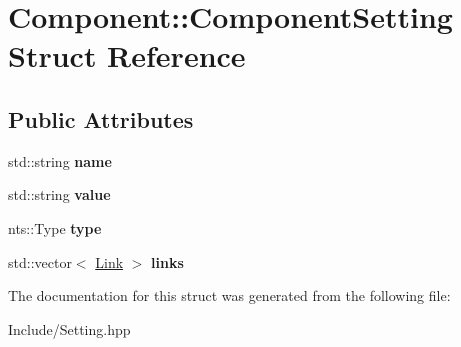 \hypertarget{structComponent_1_1ComponentSetting}{}\section{Component\+:\+:Component\+Setting Struct Reference}
\label{structComponent_1_1ComponentSetting}
\subsection*{Public Attributes}
\begin{DoxyCompactItemize}
\item 
\mbox{\label{structComponent_1_1ComponentSetting_aae5ad8d8f44adeb832d1cb1359835ead}} 
std\+::string {\bfseries name}
\item 
\mbox{\label{structComponent_1_1ComponentSetting_a694498bbd5915773b32ee1c0e702f496}} 
std\+::string {\bfseries value}
\item 
\mbox{\label{structComponent_1_1ComponentSetting_a3545a3c79285d29ba412eed11fb8331a}} 
nts\+::\+Type {\bfseries type}
\item 
\mbox{\label{structComponent_1_1ComponentSetting_a935fc46bbed4216aab77ea7b27708e8f}} 
std\+::vector$<$ \mbox{\hyperlink{structComponent_1_1Link}{Link}} $>$ {\bfseries links}
\end{DoxyCompactItemize}


The documentation for this struct was generated from the following file\+:\begin{DoxyCompactItemize}
\item 
Include/Setting.\+hpp\end{DoxyCompactItemize}
